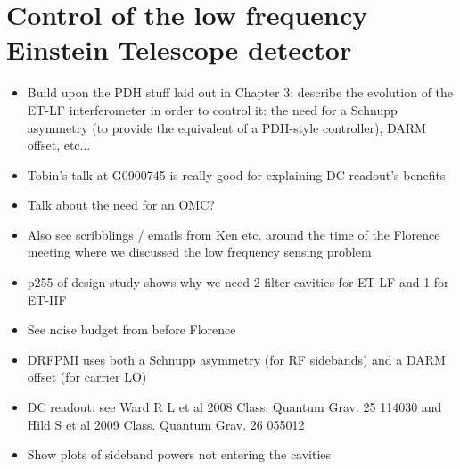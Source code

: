 \chapter{\label{c:et-lf-control}Control of the low frequency Einstein Telescope detector}

\begin{itemize}
  \item Build upon the PDH stuff laid out in Chapter 3: describe the evolution of the ET-LF interferometer in order to control it: the need for a Schnupp asymmetry (to provide the equivalent of a PDH-style controller), DARM offset, etc...
  
  \item Tobin's talk at G0900745 is really good for explaining DC readout's benefits
  
  \item Talk about the need for an OMC?
  
  \item Also see scribblings / emails from Ken etc. around the time of the Florence meeting where we discussed the low frequency sensing problem
  
  \item p255 of design study shows why we need 2 filter cavities for ET-LF and 1 for ET-HF
  
  \item See noise budget from before Florence
  
  \item DRFPMI uses both a Schnupp asymmetry (for RF sidebands) and a DARM offset (for carrier LO)
  
  \item DC readout: see Ward R L et al 2008 Class. Quantum Grav. 25 114030 and Hild S et al 2009 Class. Quantum Grav. 26 055012
  
  \item Show plots of sideband powers not entering the cavities


\end{itemize}
